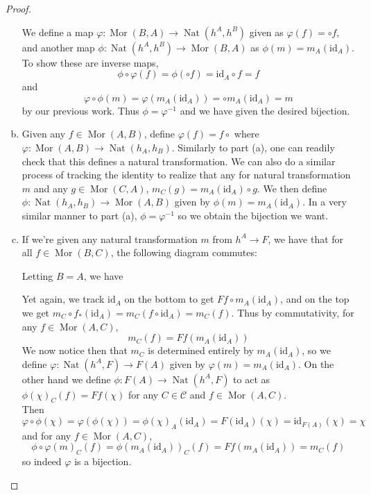 \documentclass{article}
\newcommand{\id}{\mathrm{id}}
\newcommand{\fC}{\mathscr{C}}
\DeclareMathOperator{\Mor}{Mor}
\DeclareMathOperator{\Nat}{Nat}
\begin{document}
\begin{proof}
\begin{enumerate}[(a)]
        \newline
        We define a map $\varphi:\Mor(B,A)\to \Nat(h^A,h^B)$ given as $\varphi(f)=\circ f$, and another map $\phi:\Nat(h^A,h^B)\to \Mor(B,A)$ as $\phi(m)=m_A(\id_A)$. To show these are inverse maps, 
        \[
        \phi \circ \varphi(f)=\phi(\circ f)=\id_A\circ f=f
        \]
        and
        \[
        \varphi \circ \phi(m)=\varphi(m_A(\id_A))=\circ m_A(\id_A)=m
        \]
        by our previous work. Thus $\phi=\varphi^{-1}$ and we have given the desired bijection.
        \item 
        Given any $f\in \Mor(A,B)$, define $\varphi(f)=f\circ$ where $\varphi:\Mor(A,B)\to \Nat(h_A,h_B)$. Similarly to part (a), one can readily check that this defines a natural transformation. We can also do a similar process of tracking the identity to realize that any for natural transformation $m$ and any $g\in \Mor(C,A)$, $m_C(g)=m_A(\id_A)\circ g$. We then define $\phi:\Nat(h_A,h_B)\to \Mor(A,B)$ given by $\phi(m)=m_A(\id_A)$. In a very similar manner to part (a), $\phi=\varphi^{-1}$ so we obtain the bijection we want.
        \item 
        If we're given any natural transformation $m$ from $h^A\to F$, we have that for all $f\in \Mor(B,C)$, the following diagram commutes:
        \begin{center}
        \end{center}
        Letting $B=A$, we have
        \begin{center}
        \end{center}
        Yet again, we track $\id_A$ on the bottom to get $Ff\circ m_A(\id_A)$, and on the top we get $m_C\circ f_*(\id_A)=m_C(f\circ \id_A)=m_C(f)$. Thus by commutativity, for any $f\in \Mor(A,C)$, 
        \[
        m_C(f)=Ff(m_A(\id_A))
        \]
        We now notice then that $m_C$ is determined entirely by $m_A(\id_A)$, so we define $\varphi:\Nat(h^A,F)\to F(A)$ given by $\varphi(m)=m_A(\id_A)$. On the other hand we define $\phi:F(A)\to \Nat(h^A,F)$ to act as $\phi(\chi)_C(f)=Ff(\chi)$ for any $C\in \fC$ and $f\in \Mor(A,C)$.\\
        \newline
        Then
        \[
        \varphi\circ \phi(\chi)=\varphi( \phi(\chi))=\phi(\chi)_A(\id_A)=F(\id_A)(\chi)=\id_{F(A)}(\chi)=\chi
        \]
        and for any $f\in \Mor(A,C)$,
        \[
        \phi\circ \varphi(m)_C(f)=\phi(m_A(\id_A))_C(f)=Ff(m_A(\id_A))=m_C(f)
        \]
        so indeed $\varphi$ is a bijection.
    \end{enumerate}
\end{proof}
\end{document}
